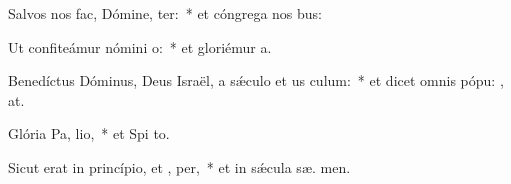 \item Salvos nos fac, Dómine,  ter:~* et cóngrega nos  bus:
\item Ut confiteámur nómini  o:~* et gloriémur   a.
\item Benedíctus Dóminus, Deus Israël, a sǽculo et us  culum:~* et dicet omnis pópu: , at.
\item Glória Pa,  lio,~* et Spi to.
\item Sicut erat in princípio, et ,  per,~* et in sǽcula sæ. men.
